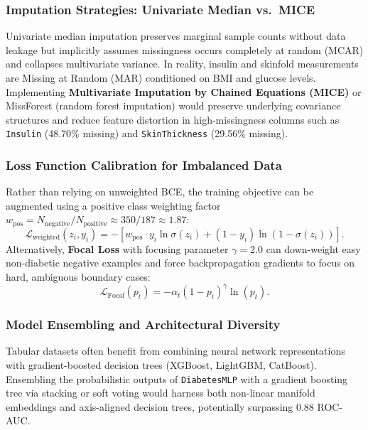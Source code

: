 \documentclass[11pt,a4paper]{article}
\begin{document}
\subsubsection{Imputation Strategies: Univariate Median vs.\ MICE}
Univariate median imputation preserves marginal sample counts without data leakage but implicitly assumes missingness occurs completely at random (MCAR) and collapses multivariate variance. In reality, insulin and skinfold measurements are Missing at Random (MAR) conditioned on BMI and glucose levels. Implementing \textbf{Multivariate Imputation by Chained Equations (MICE)} or MissForest (random forest imputation) would preserve underlying covariance structures and reduce feature distortion in high-missingness columns such as \texttt{Insulin} (48.70\% missing) and \texttt{SkinThickness} (29.56\% missing).

\subsubsection{Loss Function Calibration for Imbalanced Data}
Rather than relying on unweighted BCE, the training objective can be augmented using a positive class weighting factor $w_{\text{pos}} = N_{\text{negative}} / N_{\text{positive}} \approx 350 / 187 \approx 1.87$:
\begin{equation}
    \mathcal{L}_{\text{weighted}}(z_i, y_i) = - \left[ w_{\text{pos}} \cdot y_i \ln \sigma(z_i) + (1 - y_i) \ln(1 - \sigma(z_i)) \right].
\end{equation}
Alternatively, \textbf{Focal Loss} \cite{he2015delving} with focusing parameter $\gamma = 2.0$ can down-weight easy non-diabetic negative examples and force backpropagation gradients to focus on hard, ambiguous boundary cases:
\begin{equation}
    \mathcal{L}_{\text{Focal}}(p_t) = -\alpha_t (1 - p_t)^\gamma \ln(p_t).
\end{equation}

\subsubsection{Model Ensembling and Architectural Diversity}
Tabular datasets often benefit from combining neural network representations with gradient-boosted decision trees (XGBoost, LightGBM, CatBoost). Ensembling the probabilistic outputs of \texttt{DiabetesMLP} with a gradient boosting tree via stacking or soft voting would harness both non-linear manifold embeddings and axis-aligned decision trees, potentially surpassing 0.88 ROC-AUC.
\end{document}
